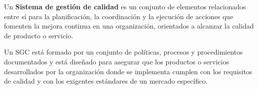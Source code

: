 
\begin{definition}
[SGC]
Un \textbf{Sistema de gestión de calidad} es un 
conjunto de elementos relacionados entre sí para la planificación, la coordinación y la ejecución de acciones que fomenten la mejora continua en una organización, orientados a alcanzar la calidad de producto o servicio.
\end{definition}

Un SGC está formado por un conjunto de políticas, procesos y procedimientos documentados y está diseñado para asegurar que los productos o servicios desarrollados por la organización donde se implementa cumplen con los requisitos de calidad y con los exigentes estándares de un mercado específico.

